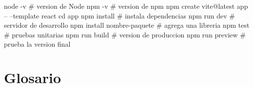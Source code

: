 \documentclass[11pt,a4paper]{article}
\begin{document}
\begin{terminal}
node -v                                   # version de Node
npm -v                                    # version de npm
npm create vite@latest app -- --template react
cd app
npm install                               # instala dependencias
npm run dev                               # servidor de desarrollo
npm install nombre-paquete                # agrega una libreria
npm test                                  # pruebas unitarias
npm run build                             # version de produccion
npm run preview                           # prueba la version final
\end{terminal}

\section{Glosario}
\end{document}
